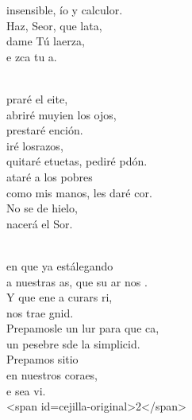 \documentclass[12pt]{article}
\begin{document}
\begin{multicols*}{2}
\begin{cancion}
	insensible, ío y calculor.\\
	Haz, Seor, que lata, \\
	dame Tú laerza,\\
	e zca tu a.\\\jump\\
	\begin{chorus}%
	praré el eite, \\
	abriré muyien los ojos, \\
	prestaré ención.\\
	iré losrazos, \\
	quitaré etuetas, pediré pdón.\\
	ataré a los pobres \\
	como mis manos, les daré cor.\\
	No se de hielo,  \\
	nacerá el Sor.\\
	\end{chorus}%
	\jump\\
	en que ya estálegando  \\
	a nuestras as, que su ar nos .\\
	Y que ene a curars  ri, \\
	nos trae gnid.\\
	Prepamosle un lur para que ca,  \\
	un pesebre sde la simplicid.\\
	Prepamos sitio \\
	en nuestros coraes,\\
	e sea vi.\\
<span id=cejilla-original>2</span>\\
\end{cancion}%


\end{multicols*}
\end{document}
